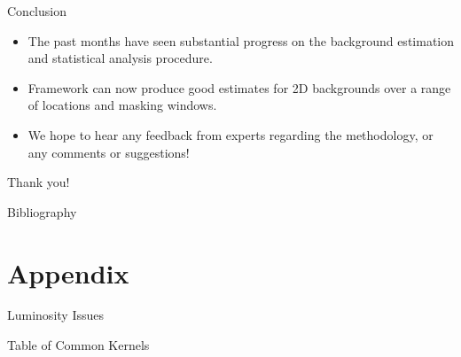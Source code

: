 \documentclass[10pt]{beamer}
\begin{document}
\begin{frame}{Conclusion}
  \begin{itemize}
  \item The past months have seen substantial progress on the background estimation and statistical analysis procedure.
  \item Framework can now produce good estimates for 2D backgrounds over a range of locations and masking windows.
  \item We hope to hear any feedback from experts regarding the methodology, or any comments or suggestions!
  \end{itemize}
  \vspace{1cm}

  \begin{center}
    {\Large Thank you!}
  \end{center}
\end{frame}


\begin{frame}{Bibliography}
  
  
\end{frame}


\appendix

\section{Appendix}
\label{sec:appendix}


\begin{frame}{Luminosity Issues}
  \relax  
\end{frame}

\begin{frame}{Table of Common Kernels}
  \relax  
\end{frame}
\end{document}
